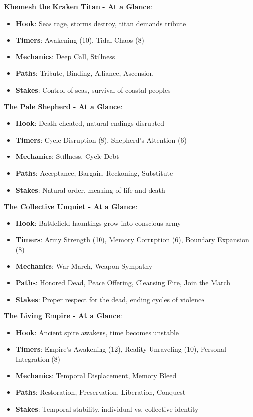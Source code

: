 \documentclass[11pt]{article}
\begin{document}
\begin{mdframed}[backgroundcolor=epicbg]
\textbf{Khemesh the Kraken Titan - At a Glance}:
\begin{itemize}[leftmargin=*]
\item \textbf{Hook}: Seas rage, storms destroy, titan demands tribute
\item \textbf{Timers}: Awakening (10), Tidal Chaos (8)
\item \textbf{Mechanics}: Deep Call, Stillness
\item \textbf{Paths}: Tribute, Binding, Alliance, Ascension
\item \textbf{Stakes}: Control of seas, survival of coastal peoples
\end{itemize}

\textbf{The Pale Shepherd - At a Glance}:
\begin{itemize}[leftmargin=*]
\item \textbf{Hook}: Death cheated, natural endings disrupted
\item \textbf{Timers}: Cycle Disruption (8), Shepherd's Attention (6)
\item \textbf{Mechanics}: Stillness, Cycle Debt
\item \textbf{Paths}: Acceptance, Bargain, Reckoning, Substitute
\item \textbf{Stakes}: Natural order, meaning of life and death
\end{itemize}

\textbf{The Collective Unquiet - At a Glance}:
\begin{itemize}[leftmargin=*]
\item \textbf{Hook}: Battlefield hauntings grow into conscious army
\item \textbf{Timers}: Army Strength (10), Memory Corruption (6), Boundary Expansion (8)
\item \textbf{Mechanics}: War March, Weapon Sympathy
\item \textbf{Paths}: Honored Dead, Peace Offering, Cleansing Fire, Join the March
\item \textbf{Stakes}: Proper respect for the dead, ending cycles of violence
\end{itemize}

\textbf{The Living Empire - At a Glance}:
\begin{itemize}[leftmargin=*]
\item \textbf{Hook}: Ancient spire awakens, time becomes unstable
\item \textbf{Timers}: Empire's Awakening (12), Reality Unraveling (10), Personal Integration (8)
\item \textbf{Mechanics}: Temporal Displacement, Memory Bleed
\item \textbf{Paths}: Restoration, Preservation, Liberation, Conquest
\item \textbf{Stakes}: Temporal stability, individual vs. collective identity
\end{itemize}
\end{mdframed}
\end{document}
